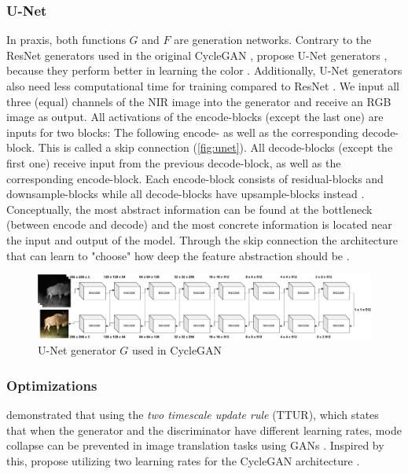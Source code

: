 \subsubsection*{U-Net}
\label{sec:cycle-gan-u-net}
In praxis, both functions $G$ and $F$ are generation networks. Contrary to the ResNet generators \parencite{resnet} \citeauthor{cyclegan-original} used in the original CycleGAN \parencite{cyclegan-original},
\citeauthor*{mehri} propose U-Net generators \parencite{unet}, because they perform better in learning the color \parencite{mehri}.
Additionally, U-Net generators also need less computational time for training compared to ResNet \parencite{mehri}.
We input all three (equal) channels of the NIR image into the generator and receive an RGB image as output.
All activations of the encode-blocks (except the last one) are inputs for two blocks:
The following encode- as well as the corresponding decode-block. This is called a skip connection \parencite{unet} (\autoref{fig:unet}). 
All decode-blocks (except the first one) receive input from the previous decode-block, as well as the corresponding encode-block.
Each encode-block consists of residual-blocks and downsample-blocks while all decode-blocks have upsample-blocks instead \parencite{unet}. 
Conceptually, the most abstract information can be found at the bottleneck (between encode and decode) and the most concrete information is located near the input and output of the model.
Through the skip connection the architecture that can learn to "choose" how deep the feature abstraction should be \parencite{unet}.

\begin{figure}[h]
   \includegraphics[width=\textwidth]{gfx/CycleGAN-Unet.pdf}
   \caption{
      U-Net generator $G$ used in CycleGAN \parencite{unet,mehri}
   }
   \label{fig:unet}
\end{figure}

\subsubsection*{Optimizations}
 demonstrated that using the \textit{two timescale update rule} (TTUR), which states that when the generator and the discriminator have different learning rates,
mode collapse can be prevented in image translation tasks using GANs \parencite{ttur}.
Inspired by this, \citeauthor*{mehri} propose utilizing two learning rates for the CycleGAN architecture \parencite{mehri}.

